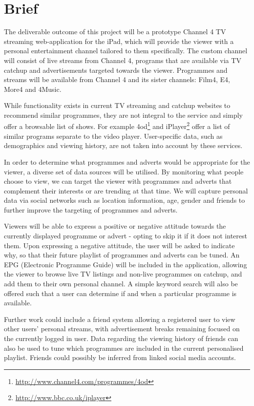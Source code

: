 \section{Brief}
\label{sec:appendix_brief}

The deliverable outcome of this project will be a prototype Channel 4 TV streaming web-application for the iPad, which will provide the viewer with a personal entertainment channel tailored to them specifically. The custom channel will consist of live streams from Channel 4, programs that are available via TV catchup and advertisements targeted towards the viewer. Programmes and streams will be available from Channel 4 and its sister channels: Film4, E4, More4 and 4Music.

While functionality exists in current TV streaming and catchup websites to recommend similar programmes, they are not integral to the service and simply offer a browsable list of shows. For example 4od\footnote{\url{http://www.channel4.com/programmes/4od}} and iPlayer\footnote{\url{http://www.bbc.co.uk/iplayer}} offer a list of similar programs separate to the video player. User-specific data, such as demographics and viewing history, are not taken into account by these services.

In order to determine what programmes and adverts would be appropriate for the viewer, a diverse set of data sources will be utilised. By monitoring what people choose to view, we can target the viewer with programmes and adverts that complement their interests or are trending at that time. We will capture personal data via social networks such as location information, age, gender and friends to further improve the targeting of programmes and adverts.

Viewers will be able to express a positive or negative attitude towards the currently displayed programme or advert - opting to skip it if it does not interest them. Upon expressing a negative attitude, the user will be asked to indicate why, so that their future playlist of programmes and adverts can be tuned. An EPG (Electronic Programme Guide) will be included in the application, allowing the viewer to browse live TV listings and non-live programmes on catchup, and add them to their own personal channel. A simple keyword search will also be offered such that a user can determine if and when a particular programme is available. 

Further work could include a friend system allowing a registered user to view other users’ personal streams, with advertisement breaks remaining focused on the currently logged in user. Data regarding the viewing history of friends can also be used to tune which programmes are included in the current personalised playlist. Friends could possibly be inferred from linked social media accounts.

